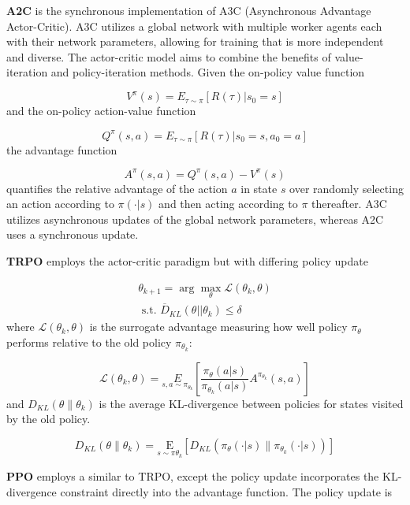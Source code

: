 \documentclass[conference]{IEEEtran}
\begin{document}
\textbf{A2C} is the synchronous implementation of A3C (Asynchronous Advantage Actor-Critic). A3C utilizes a global network with multiple worker agents each with their network parameters, allowing for training that is more independent and diverse. The actor-critic model aims to combine the benefits of value-iteration and policy-iteration methods. Given the on-policy value function 

$$V^{\pi}(s) = E_{\tau \sim \pi}[R(\tau)|s_0 = s]$$
\noindent
and the on-policy action-value function

$$Q^{\pi}(s,a) = E_{\tau \sim \pi}[R(\tau)|s_0 = s, a_0 = a]$$
\noindent
the advantage function

$$A^{\pi}(s,a) = Q^{\pi}(s,a) - V^{\pi}(s)$$
\noindent
quantifies the relative advantage of the action $a$ in state $s$ over randomly selecting an action according to $\pi(\cdot|s)$ and then acting according to $\pi$ thereafter. A3C utilizes asynchronous updates of the global network parameters, whereas A2C uses a synchronous update. 

\textbf{TRPO} employs the actor-critic paradigm but with differing policy update

$$\begin{array} { r } { \theta _ { k + 1 } = \arg \max _ { \theta } \mathcal { L } \left( \theta _ { k } , \theta \right) } \\ { \text { s.t. } \overline { D } _ { K L } \left( \theta | | \theta _ { k } \right) \leq \delta } \end{array}$$
\noindent
where $\mathcal { L } \left( \theta _ { k } , \theta \right)$ is the surrogate advantage measuring how well policy $\pi_\theta$ performs relative to the old policy $\pi_{\theta_{k}}$:

$$\mathcal { L } \left( \theta _ { k } , \theta \right) = \underset { s , a \sim \pi _ { \theta _ { k } } } { E } \left[ \frac { \pi _ { \theta } ( a | s ) } { \pi _ { \theta _ { k } } ( a | s ) } A ^ { \pi _ { \theta _ { k } } } ( s , a ) \right]$$
\noindent
and $D _ { K L } ( \theta \| \theta _ { k } )$ is the average KL-divergence between policies for states visited by the old policy.

$$D _ { K L } ( \theta \| \theta _ { k } ) = \underset { s \sim \pi \theta _ { k } } { \mathrm { E } } \left[ D _ { K L } \left( \pi _ { \theta } ( \cdot | s ) \| \pi _ { \theta _ { k } } ( \cdot | s ) \right) \right]$$

\textbf{PPO} employs a similar to TRPO, except the policy update incorporates the KL-divergence constraint directly into the advantage function. The policy update is 
\end{document}
